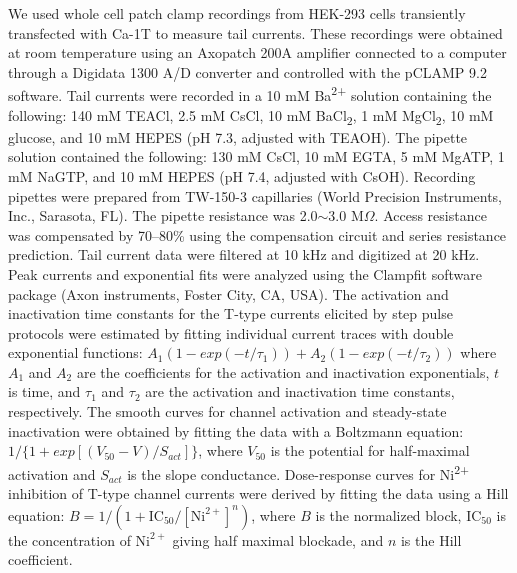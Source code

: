 We used whole cell patch clamp recordings from HEK-293 cells transiently transfected with Ca-\alpha1T to measure tail currents. 
These recordings were obtained at room temperature using an Axopatch 200A amplifier connected to a computer through a Digidata 1300 A/D converter and controlled with the pCLAMP 9.2 software.
Tail currents were recorded in a 10 mM Ba\textsuperscript{2+} solution containing the following: 140 mM TEACl, 2.5 mM CsCl, 10 mM BaCl\textsubscript{2}, 1 mM MgCl\textsubscript{2}, 10 mM glucose, and 10 mM HEPES (pH 7.3, adjusted with TEAOH).
The pipette solution contained the following: 130 mM CsCl, 10 mM EGTA, 5 mM MgATP, 1 mM NaGTP, and 10 mM HEPES (pH 7.4, adjusted with CsOH). 
Recording pipettes were prepared from TW-150-3 capillaries (World Precision Instruments, Inc., Sarasota, FL).
The pipette resistance was 2.0$\sim$3.0 M$\Omega$.
Access resistance was compensated by 70--80\% using the compensation circuit and series resistance prediction.
Tail current data were filtered at 10 kHz and digitized at 20 kHz.
Peak currents and exponential fits were analyzed using the Clampfit software package (Axon instruments, Foster City, CA, USA).
The activation and inactivation time constants for the T-type currents elicited by step pulse protocols were estimated by fitting individual current traces with double exponential functions: $A_{1}(1-exp(-t/\tau_{1})) + A_{2}(1-exp(-t/\tau_{2}))$ where $A_{1}$ and $A_{2}$ are the coefficients for the activation and inactivation exponentials, $t$ is time, and $\tau_{1}$ and $\tau_{2}$ are the activation and inactivation time constants, respectively.
The smooth curves for channel activation and steady-state inactivation were obtained by fitting the data with a Boltzmann equation: $1/\{1+exp[(V_{50}-V)/S_{act}]\}$, where $V_{50}$ is the potential for half-maximal activation and $S_{act}$ is the slope conductance.
Dose-response curves for Ni\textsuperscript{2+} inhibition of T-type channel currents were derived by fitting the data using a Hill equation: $B = 1/(1 + \textrm{IC}_{50}/[\textrm{Ni}^{2+}]^n)$, where $B$ is the normalized block, $\textrm{IC}_{50}$ is the concentration of $\textrm{Ni}^{2+}$ giving half maximal blockade, and $n$ is the Hill coefficient.
